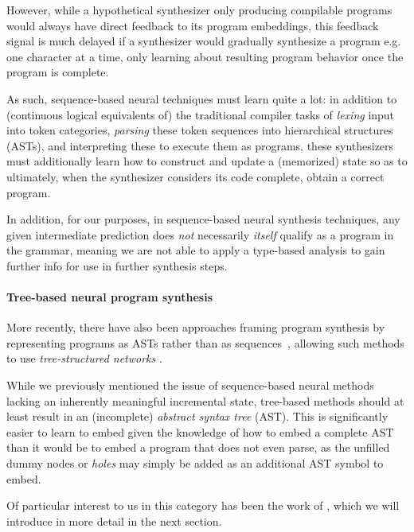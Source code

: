 \documentclass{article}
\begin{document}
However, while a hypothetical synthesizer only producing compilable programs would always have direct feedback to its program embeddings,
this feedback signal is much delayed if a synthesizer would gradually synthesize a program e.g. one character at a time,
only learning about resulting program behavior once the program is complete.

As such, sequence-based neural techniques must learn quite a lot:
in addition to (continuous logical equivalents of) the traditional compiler tasks of \emph{lexing} input into token categories,
\emph{parsing} these token sequences into hierarchical structures (ASTs),
and interpreting these to execute them as programs,
these synthesizers must additionally learn how to construct and update a (memorized) state so as to ultimately,
when the synthesizer considers its code complete, obtain a correct program.

In addition, for our purposes, in sequence-based neural synthesis techniques,
any given intermediate prediction does \emph{not} necessarily \emph{itself} qualify as a program in the grammar,
meaning we are not able to apply a type-based analysis to gain further info for use in further synthesis steps.

\paragraph{Tree-based neural program synthesis}

More recently, there have also been approaches framing program synthesis by representing programs as ASTs rather than as sequences~\citep{polosukhin2018neural},
allowing such methods to use \emph{tree-structured networks}%
.

While
we previously
mentioned the issue of
sequence-based neural methods lacking an inherently meaningful incremental state,
tree-based methods should at least result in an (incomplete) \emph{abstract syntax tree} (AST).
This is significantly easier to learn to embed given the knowledge of how to embed a complete AST than it would be to embed a program that does not even parse,
as the unfilled dummy nodes or \emph{holes} may simply be added as an additional AST symbol to embed.

Of particular interest to us in this category has been the work of \citet{nsps},
which we will introduce in more detail in the next section.
\end{document}
